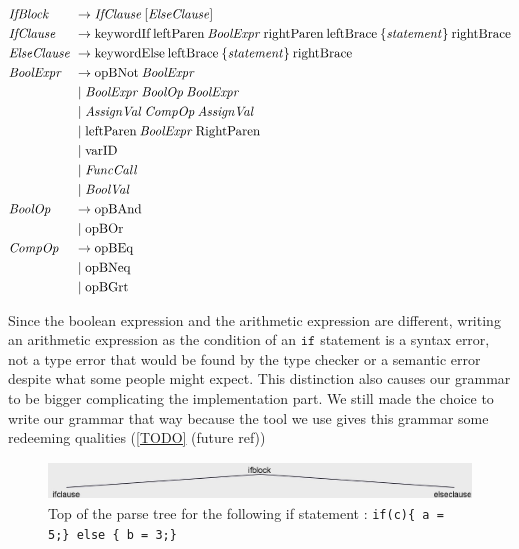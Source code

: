 \begin{align*}
    \omit $\mathit{IfBlock}$ \hfil &\rightarrow \mathit{IfClause} \: [\mathit{ElseClause}] \\
    \omit $\mathit{IfClause}$ \hfil &\rightarrow \text{keywordIf} \: \text{leftParen} \: \mathit{BoolExpr} \: \text{rightParen} \: \text{leftBrace} \: \{ \mathit{statement}\} \: \text{rightBrace} \\
    \omit $\mathit{ElseClause}$ \hfil &\rightarrow \text{keywordElse} \: \text{leftBrace} \: \{ \mathit{statement} \} \: \text{rightBrace} \\
    \omit $\mathit{BoolExpr}$ \hfil &\rightarrow \text{opBNot} \: \mathit{BoolExpr} \\
    & \mid \mathit{BoolExpr} \: \mathit{BoolOp} \: \mathit{BoolExpr} \\
    & \mid \mathit{AssignVal} \: \mathit{CompOp} \: \mathit{AssignVal} \\
    & \mid \text{leftParen} \: \mathit{BoolExpr} \: \text{RightParen} \\
    & \mid \text{varID} \\
    & \mid \mathit{FuncCall} \\
    & \mid \mathit{BoolVal} \\
    \omit $\mathit{BoolOp}$ \hfil &\rightarrow \text{opBAnd} \\
    & \mid \text{opBOr} \\
    \omit $\mathit{CompOp}$ \hfil & \rightarrow \text{opBEq} \\
    & \mid \text{opBNeq} \\
    & \mid \text{opBGrt}
\end{align*}

Since the boolean expression and the arithmetic expression are different, writing an arithmetic expression as the condition of an $\texttt{if}$ statement is a syntax error, not a type error that would be found by the type checker or a semantic error despite what some people might expect.
This distinction also causes our grammar to be bigger complicating the implementation part.
We still made the choice to write our grammar that way because the tool we use gives this grammar some redeeming qualities (\ref{TODO} (future ref))

\begin{figure}[H]
    \centering
    \includegraphics[height = 1cm]{figures/parse_trees/parseTree_ifblock}
    \caption{Top of the parse tree for the following if statement : \texttt{if(c)\{
        a = 5;\}
        else \{
            b = 3;\}}}
    \label{fig:parseTree_ifblock}
\end{figure}

